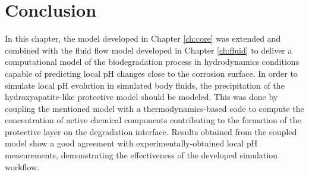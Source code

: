 \section{Conclusion}

In this chapter, the model developed in Chapter \ref{ch:core} was extended and combined with the fluid flow model developed in Chapter \ref{ch:fluid} to deliver a computational model of the biodegradation process in hydrodynamics conditions capable of predicting local pH changes close to the corrosion surface. In order to simulate local pH evolution in simulated body fluids, the precipitation of the hydroxyapatite-like protective model should be modeled. This was done by coupling the mentioned model with a thermodynamics-based code to compute the concentration of active chemical components contributing to the formation of the protective layer on the degradation interface. Results obtained from the coupled model show a good agreement with experimentally-obtained local pH measurements, demonstrating the effectiveness of the developed simulation workflow.

%
%
%
%
%
%


\cleardoublepage
